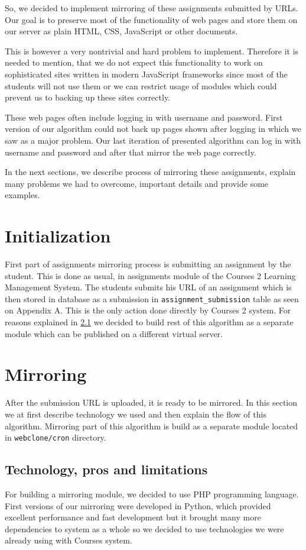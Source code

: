 So, we decided to implement mirroring of these assignments submitted by URLs. Our goal is to preserve most of the functionality of web pages and store them on our server as plain HTML, CSS, JavaScript or other documents. 

This is however a very nontrivial and hard problem to implement. Therefore it is needed to mention, that we do not expect this functionality to work on sophisticated sites written in modern JavaScript frameworks since most of the students will not use them or we can restrict usage of modules which could prevent us to backing up these sites correctly.

These web pages often include logging in with username and password. First version of our algorithm could not back up pages shown after logging in which we saw as a major problem. Our last iteration of presented algorithm can log in with username and password and after that mirror the web page correctly.

In the next sections, we describe process of mirroring these assignments, explain many problems we had to overcome, important details and provide some examples.

\section{Initialization}
First part of assignments mirroring process is submitting an assignment by the student. This is done as usual, in assignments module of the Courses 2 Learning Management System. The students submits his URL of an assignment which is then stored in database as a submission in \texttt{assignment\_submission} table as seen on Appendix A. This is the only action done directly by Courses 2 system. For reasons explained in \ref{sec:technology} we decided to build rest of this algorithm as a separate module which can be published on a different virtual server.

\section{Mirroring}
After the submission URL is uploaded, it is ready to be mirrored. In this section we at first describe technology we used and then explain the flow of this algorithm. Mirroring part of this algorithm is build as a separate module located in \texttt{webclone/cron} directory.

\subsection{Technology, pros and limitations}
\label{sec:technology}
For building a mirroring module, we decided to use PHP programming language. First versions of our mirroring were developed in Python, which provided excellent performance and fast development but it brought many more dependencies to system as a whole so we decided to use technologies we were already using with Courses system. 

